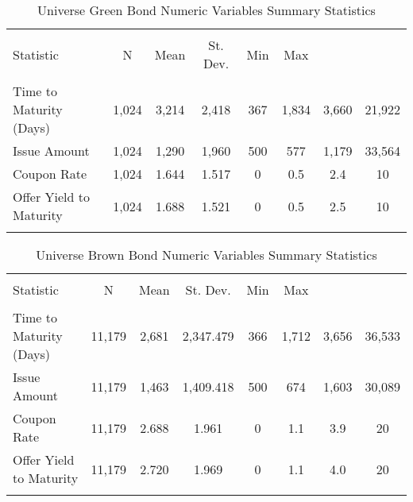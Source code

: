 \begin{table}[!htbp] \centering 
  \caption{Universe Green Bond Numeric Variables Summary Statistics} 
  \label{greensum} 
  \small
\begin{tabular}{@{\extracolsep{5pt}}lccccccc} 
\\[-1.8ex]\hline 
\hline \\[-1.8ex] 
Statistic & \multicolumn{1}{c}{N} & \multicolumn{1}{c}{Mean} & \multicolumn{1}{c}{St. Dev.} & \multicolumn{1}{c}{Min} & \multicolumn{1}{c}{Max} \\ 
\hline \\[-1.8ex] 
Time to Maturity (Days) & 1,024 & 3,214 & 2,418 & 367 & 1,834 & 3,660 & 21,922 \\ 
Issue Amount & 1,024 & 1,290 & 1,960 & 500 & 577 & 1,179 & 33,564 \\ 
Coupon Rate & 1,024 & 1.644 & 1.517 & 0 & 0.5 & 2.4 & 10 \\ 
Offer Yield to Maturity & 1,024 & 1.688 & 1.521 & 0 & 0.5 & 2.5 & 10 \\ 
\hline \\[-1.8ex] 
\end{tabular} 
\end{table}

\begin{table}[!htbp] \centering 
  \caption{Universe Brown Bond Numeric Variables Summary Statistics} 
  \label{brownsum} 
  \small
\begin{tabular}{@{\extracolsep{5pt}}lccccccc} 
\\[-1.8ex]\hline 
\hline \\[-1.8ex] 
Statistic & \multicolumn{1}{c}{N} & \multicolumn{1}{c}{Mean} & \multicolumn{1}{c}{St. Dev.} & \multicolumn{1}{c}{Min} & \multicolumn{1}{c}{Max} \\ 
\hline \\[-1.8ex] 
Time to Maturity (Days) & 11,179 & 2,681 & 2,347.479 & 366 & 1,712 & 3,656 & 36,533 \\ 
Issue Amount & 11,179 & 1,463 & 1,409.418 & 500 & 674 & 1,603 & 30,089 \\ 
Coupon Rate & 11,179 & 2.688 & 1.961 & 0 & 1.1 & 3.9 & 20 \\ 
Offer Yield to Maturity & 11,179 & 2.720 & 1.969 & 0 & 1.1 & 4.0 & 20 \\ 
\hline \\[-1.8ex] 
\end{tabular} 
\end{table} 

